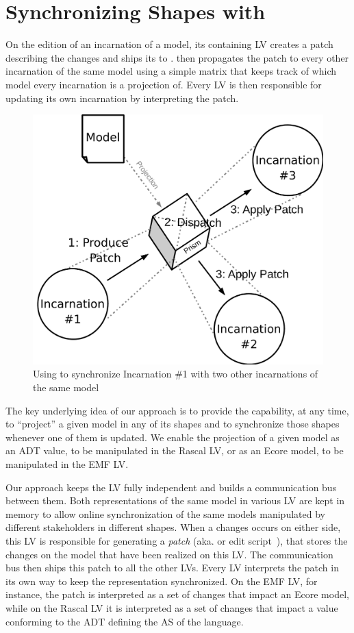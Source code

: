 \section{Synchronizing Shapes with \prism}
\label{sec:prism}


On the edition of an incarnation of a model, its containing LV creates a patch describing the changes and ships its to \prism.
\prism then propagates the patch to every other incarnation of the same model using a simple matrix that keeps track of which model every incarnation is a projection of.
Every LV is then responsible for updating its own incarnation by interpreting the patch.

\begin{figure}[bt]
	\centering
	\includegraphics[width=.6\columnwidth]{figures/prism}
	\caption{Using \prism to synchronize Incarnation \#1 with two other incarnations of the same model}
	\label{fig:prism}
\end{figure}

The key underlying idea of our approach is to provide the capability, at any time, to ``project'' a given model in any of its shapes and to synchronize those shapes whenever one of them is updated.
We enable the projection of a given model as an ADT value, to be manipulated in the Rascal LV, or as an Ecore model, to be manipulated in the EMF LV.

Our approach keeps the LV fully independent and builds a communication bus between them.
Both representations of the same model in various LV are kept in memory to allow online synchronization of the same models manipulated by different stakeholders in different shapes.
When a changes occurs on either side, this LV is responsible for generating a \emph{patch} (aka. \de or edit script~\cite{rozen2017towards}), that stores the changes on the model that have been realized on this LV.
The communication bus then ships this patch to all the other LVs.
Every LV interprets the patch in its own way to keep the representation synchronized.
On the EMF LV, for instance, the patch is interpreted as a set of changes that impact an Ecore model, while on the Rascal LV it is interpreted as a set of changes that impact a value conforming to the ADT defining the AS of the language.

